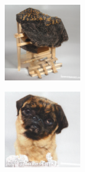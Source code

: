 \documentclass{article}
\begin{document}
\begin{figure}
\begin{subfigure}[b]{0.5\linewidth}
\begin{subfigure}[b]{0.242\linewidth}
        \end{subfigure}%
        \begin{subfigure}[b]{0.242\linewidth}
        \includegraphics[width=\linewidth]{figures/imagenet128/solver_samples/imagenet128_fm_ot_247_20.png}
        \end{subfigure}%
        \begin{subfigure}[b]{0.242\linewidth}
        \includegraphics[width=\linewidth]{figures/imagenet128/solver_samples/imagenet128_fm_ot_247_50.png}

\end{subfigure}
\end{subfigure}
\end{figure}
\end{document}
